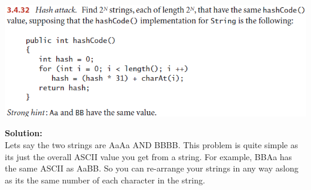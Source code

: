 \documentclass[11pt,fleqn]{article}
\begin{document}
\begin{center}
	\includegraphics[scale=.85]{3.4.32.png}
\end{center}
	
\textbf{Solution:}\\
Lets say the two strings are AaAa AND BBBB. This problem is quite simple as its just the overall ASCII value you get from a string. For example, BBAa has the same ASCII as AaBB. So you can re-arrange your strings in any way aslong as its the same number of each character in the string.
\end{document}
